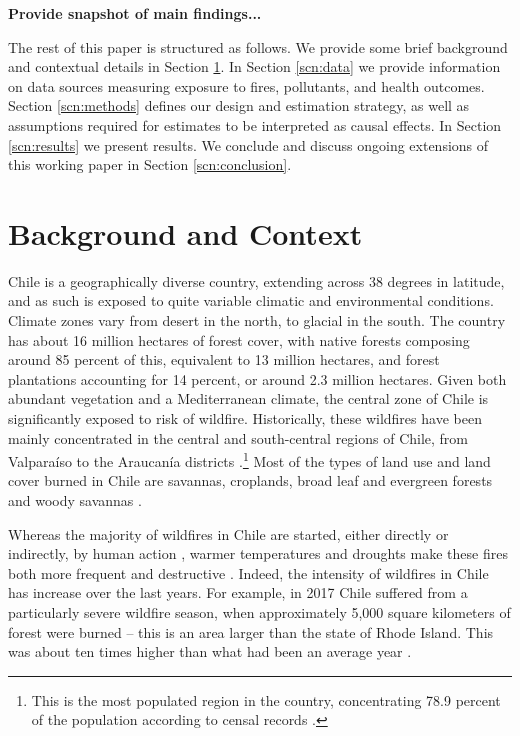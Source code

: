 \documentclass[11pt]{article}
\begin{document}
\begin{spacing}{1.5}

\textbf{Provide snapshot of main findings...}

The rest of this paper is structured as follows. We provide some brief background and contextual details in Section \ref{scn:background}.  In Section \ref{scn:data} we provide information on data sources measuring exposure to fires, pollutants, and health outcomes.  Section \ref{scn:methods} defines our design and estimation strategy, as well as assumptions required for estimates to be interpreted as causal effects.  In Section \ref{scn:results} we present results.  We conclude and discuss ongoing extensions of this working paper in Section \ref{scn:conclusion}.


\section{Background and Context}
\label{scn:background}
Chile is a geographically diverse country, extending across 38 degrees in latitude, and as such is exposed to quite variable climatic and environmental conditions.  Climate zones vary from desert in the north, to glacial in the south. The country has about 16 million hectares of forest cover, with native forests composing around 85 percent of this, equivalent to 13 million hectares, and forest plantations accounting for 14 percent, or around 2.3 million hectares. %
Given both abundant vegetation and a Mediterranean climate, the central zone of Chile is significantly exposed to risk of wildfire.  Historically, these wildfires have been mainly concentrated in the central and south-central regions of Chile, from Valparaíso to the Araucanía districts \citep{sarricolea2020recent}.\footnote{This is the most populated region in the country, concentrating 78.9 percent of the population according to censal records \citep{INE2018}.} Most of the types of land use and land cover burned in Chile are savannas, croplands, broad leaf and evergreen forests and woody savannas \citep{sarricolea2020recent}. 

Whereas the majority of wildfires in Chile are started, either directly or indirectly, by human action \citep{CONAF2022}, warmer temperatures and droughts make these fires both more frequent and destructive \citep{westerling2006warming}. Indeed, the intensity of wildfires in Chile has increase over the last years. For example, in 2017 Chile suffered from a particularly severe wildfire season, when approximately 5,000 square kilometers of forest were burned -- this is an area larger than the state of Rhode Island. This was about ten times higher than what had been an average year \citep{CONAF2022}.


\end{spacing}
\end{document}
